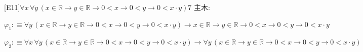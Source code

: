 \begin{fullproof}{[E11]}{$\forall x\,\forall y\,(x \in \mathbb{R} \to y \in \mathbb{R} \to 0 < x \to 0 < y \to 0 < x \cdot y)$}{7}\label{tree:MulPosPos}
\noindent 主木:
\begin{ptree}
\end{ptree}
\begin{abbrevlist}
\item $\varphi_{1} :\equiv \forall y\,(x \in \mathbb{R} \to y \in \mathbb{R} \to 0 < x \to 0 < y \to 0 < x \cdot y) \to x \in \mathbb{R} \to y \in \mathbb{R} \to 0 < x \to 0 < y \to 0 < x \cdot y$
\item $\varphi_{2} :\equiv \forall x\,\forall y\,(x \in \mathbb{R} \to y \in \mathbb{R} \to 0 < x \to 0 < y \to 0 < x \cdot y) \to \forall y\,(x \in \mathbb{R} \to y \in \mathbb{R} \to 0 < x \to 0 < y \to 0 < x \cdot y)$
\end{abbrevlist}
\end{fullproof}
